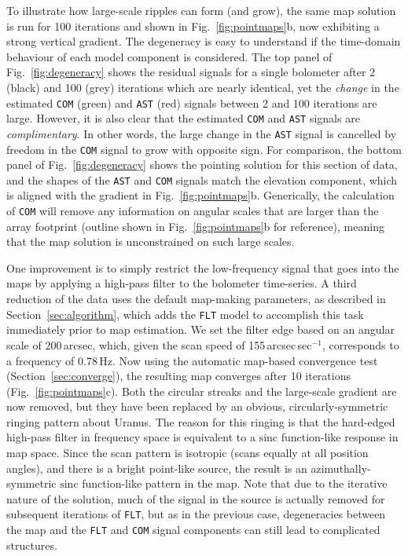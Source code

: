 \documentclass[useAMS,usenatbib,nofootinbib]{mn2e}
\def\sinc{\mathrm{sinc}}
\newcommand{\model}[1]{\texttt{#1}}
\begin{document}
To illustrate how large-scale ripples can form (and grow), the same
map solution is run for 100 iterations and shown in
Fig.~\ref{fig:pointmaps}b, now exhibiting a strong vertical
gradient. The degeneracy is easy to understand if the time-domain
behaviour of each model component is considered. The top panel of
Fig.~\ref{fig:degeneracy} shows the residual signals for a single
bolometer after 2 (black) and 100 (grey) iterations which are nearly
identical, yet the \emph{change} in the estimated \model{COM} (green)
and \model{AST} (red) signals between 2 and 100 iterations are
large. However, it is also clear that the estimated \model{COM} and
\model{AST} signals are \emph{complimentary}. In other words, the
large change in the \model{AST} signal is cancelled by freedom in the
\model{COM} signal to grow with opposite sign. For comparison, the
bottom panel of Fig.~\ref{fig:degeneracy} shows the pointing solution
for this section of data, and the shapes of the \model{AST} and
\model{COM} signals match the elevation component, which is aligned
with the gradient in Fig.~\ref{fig:pointmaps}b. Generically, the
calculation of \model{COM} will remove any information on angular
scales that are larger than the array footprint (outline shown in
Fig.~\ref{fig:pointmaps}b for reference), meaning that the map
solution is unconstrained on such large scales.

One improvement is to simply restrict the low-frequency signal that
goes into the maps by applying a high-pass filter to the bolometer
time-series. A third reduction of the data uses the default map-making
parameters, as described in Section~\ref{sec:algorithm}, which adds
the \model{FLT} model to accomplish this task immediately prior to map
estimation. We set the filter edge based on an angular scale of
200\,arcsec, which, given the scan speed of 155\,arcsec\,sec$^{-1}$,
corresponds to a frequency of 0.78\,Hz. Now using the automatic
map-based convergence test (Section~\ref{sec:converge}), the resulting
map converges after 10 iterations (Fig.~\ref{fig:pointmaps}c). Both
the circular streaks and the large-scale gradient are now removed, but
they have been replaced by an obvious, circularly-symmetric ringing
pattern about Uranus. The reason for this ringing is that the
hard-edged high-pass filter in frequency space is equivalent to a
$\sinc$ function-like response in map space. Since the scan pattern is
isotropic (scans equally at all position angles), and there is a
bright point-like source, the result is an azimuthally-symmetric
$\sinc$ function-like pattern in the map. Note that due to the
iterative nature of the solution, much of the signal in the source is
actually removed for subsequent iterations of \model{FLT}, but as in
the previous case, degeneracies between the map and the \model{FLT}
and \model{COM} signal components can still lead to complicated
structures.
\end{document}
